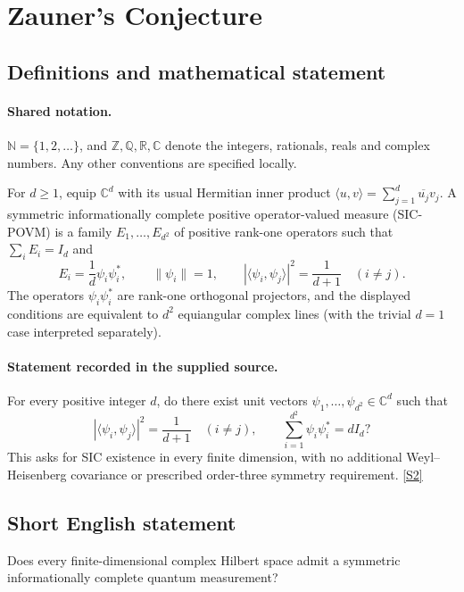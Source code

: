 \documentclass[11pt]{article}
\newcommand{\sref}[2]{\hyperlink{source:#1:#2}{[S#2]}}
\begin{document}
\section{Zauner's Conjecture}\label{statement}

\subsection{Definitions and mathematical statement}

\paragraph{Shared notation.}$\mathbb N=\{1,2,\ldots\}$, and $\mathbb Z,\mathbb Q,\mathbb R,\mathbb C$ denote the integers, rationals, reals and complex numbers. Any other conventions are specified locally.


For $d\geq1$, equip $\mathbb C^d$ with its usual Hermitian inner product $\langle u,v\rangle=\sum_{j=1}^d\overline{u_j}v_j$. A symmetric informationally complete positive operator-valued measure (SIC-POVM) is a family $E_1,\ldots,E_{d^2}$ of positive rank-one operators such that $\sum_iE_i=I_d$ and
\[
 E_i=\frac1d\psi_i\psi_i^*,\qquad
 \|\psi_i\|=1,\qquad
 |\langle\psi_i,\psi_j\rangle|^2=\frac1{d+1}\quad(i\ne j).
\]
The operators $\psi_i\psi_i^*$ are rank-one orthogonal projectors, and the displayed conditions are equivalent to $d^2$ equiangular complex lines (with the trivial $d=1$ case interpreted separately).
\paragraph{Statement recorded in the supplied source.}
For every positive integer $d$, do there exist unit vectors $\psi_1,\ldots,\psi_{d^2}\in\mathbb C^d$ such that
\[
 |\langle\psi_i,\psi_j\rangle|^2=\frac1{d+1}\quad(i\ne j),\qquad
 \sum_{i=1}^{d^2}\psi_i\psi_i^*=dI_d?
\]
This asks for SIC existence in every finite dimension, with no additional Weyl--Heisenberg covariance or prescribed order-three symmetry requirement. \sref{statement}{2}
\subsection{Short English statement}
Does every finite-dimensional complex Hilbert space admit a symmetric informationally complete quantum measurement?
\end{document}
